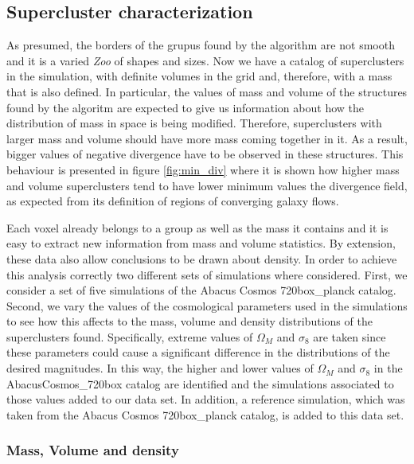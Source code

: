 \documentclass[usenatbib]{mnras}
\begin{document}
\subsection{Supercluster characterization}

As presumed, the borders of the grupus found by the algorithm are not
smooth and it is a varied \emph{Zoo} of shapes and sizes. Now we have
a catalog of superclusters in the simulation, with definite volumes in
the grid and, therefore, with a mass that is also defined. In
particular, the values of mass and volume of the structures found by
the algoritm are expected to give us information about how the
distribution of mass in space is being modified. Therefore,
superclusters with larger mass and volume should have more mass coming
together in it. As a result, bigger values of negative divergence have
to be observed in these structures. This behaviour is presented in
figure \ref{fig:min_div} where it is shown how higher mass and volume
superclusters tend to have lower minimum values the divergence field,
as expected from its definition of regions of converging galaxy flows.  


Each voxel already belongs to a group as well as the mass it contains
and it is easy to extract new information from mass and volume
statistics. By extension, these data also allow conclusions to be
drawn about density. In order to achieve this analysis correctly two
different sets of simulations where considered. First, we consider a
set of five simulations of the Abacus Cosmos 720box\_planck
catalog. Second, we vary the values of the cosmological parameters
used in the simulations to see how this affects to the mass, volume
and density distributions of the superclusters found. Specifically,
extreme values of $\Omega_M$ and $\sigma_8$ are taken since these
parameters could cause a significant difference in the distributions
of the desired magnitudes. In this way, the higher and lower values of
$\Omega_M$ and $\sigma_8$ in the AbacusCosmos\_720box catalog are
identified and the simulations associated to those values added to our
data set. In addition, a reference simulation, which was taken from
the Abacus Cosmos 720box\_planck catalog, is added to this data set. 

\subsubsection{Mass, Volume and density}
\end{document}
